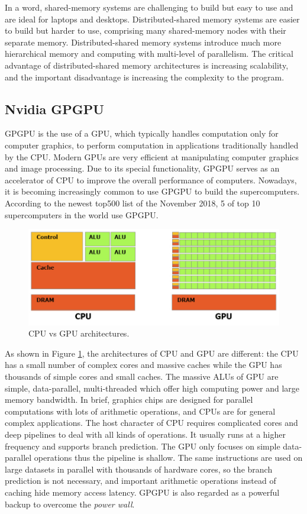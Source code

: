 In a word, shared-memory systems are challenging to build but easy to use and are ideal for laptops and desktops. Distributed-shared memory systems are easier to build but harder to use, comprising many shared-memory nodes with their separate memory. Distributed-shared memory systems introduce much more hierarchical memory and computing with multi-level of parallelism. The critical advantage of distributed-shared memory architectures is increasing scalability, and the important disadvantage is increasing the complexity to the program.

\subsection{Nvidia GPGPU}

GPGPU is the use of a GPU, which typically handles computation only for computer graphics, to perform computation in applications traditionally handled by the CPU. Modern GPUs are very efficient at manipulating computer graphics and image processing. Due to its special functionality, GPGPU serves as an accelerator of CPU to improve the overall performance of computers. Nowadays, it is becoming increasingly common to use GPGPU to build the supercomputers. According to the newest top500 list of the November 2018, 5 of top 10 supercomputers in the world use GPGPU.

\begin{figure}[htbp]
	\centering
	\includegraphics[width=0.99\linewidth]{fig/cpu_vs_gpu.png}
	\caption{CPU vs GPU architectures.}
	\label{cpuvsgpu}
\end{figure}

As shown in Figure \ref{cpuvsgpu}, the architectures of CPU and GPU are different: the CPU has a small number of complex cores and massive caches while the GPU has thousands of simple cores and small caches. The massive ALUs of GPU are simple, data-parallel, multi-threaded which offer high computing power and large memory bandwidth. In brief, graphics chips are designed for parallel computations with lots of arithmetic operations, and CPUs are for general complex applications. The host character of CPU requires complicated cores and deep pipelines to deal with all kinds of operations. It usually runs at a higher frequency and supports branch prediction. The GPU only focuses on simple data-parallel operations thus the pipeline is shallow. The same instructions are used on large datasets in parallel with thousands of hardware cores, so the branch prediction is not necessary, and important arithmetic operations instead of caching hide memory access latency. GPGPU is also regarded as a powerful backup to overcome the \textit{power wall}.


